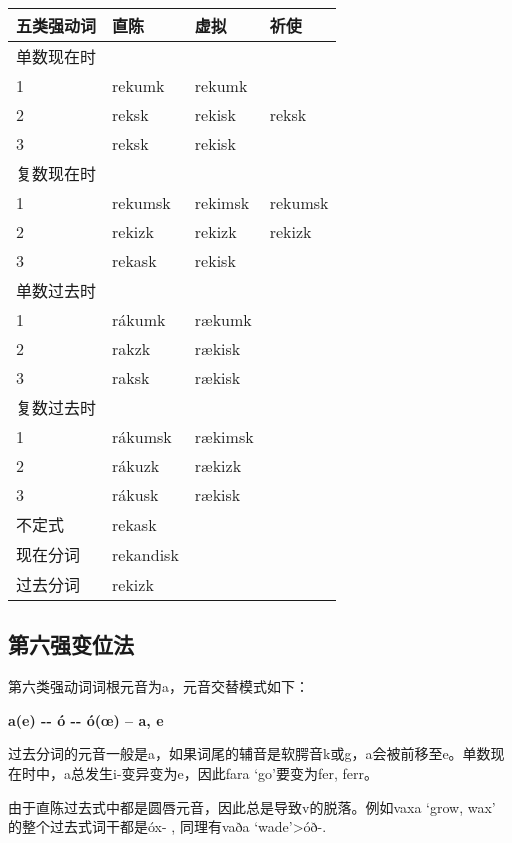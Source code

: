\begin{longtable}{llll}
  \toprule
  五类强动词 & 直陈        & 虚拟      & 祈使      \\
  \midrule
  \endhead
  \bottomrule
  \endfoot
  单数现在时 &           &         &         \\
  1     & rekumk    & rekumk  &         \\
  2     & reksk     & rekisk  & reksk   \\
  3     & reksk     & rekisk  &         \\
  复数现在时 &           &         &         \\
  1     & rekumsk   & rekimsk & rekumsk \\
  2     & rekizk    & rekizk  & rekizk  \\
  3     & rekask    & rekisk  &         \\
  单数过去时 &           &         &         \\
  1     & rákumk    & rækumk  &         \\
  2     & rakzk     & rækisk  &         \\
  3     & raksk     & rækisk  &         \\
  复数过去时 &           &         &         \\
  1     & rákumsk   & rækimsk &         \\
  2     & rákuzk    & rækizk  &         \\
  3     & rákusk    & rækisk  &         \\
  不定式   & rekask    &         &         \\
  现在分词  & rekandisk &         &         \\
  过去分词  & rekizk    &         &         \\
\end{longtable}

\subsection{第六强变位法}\label{第六强变位法}

第六类强动词词根元音为a，元音交替模式如下：

\textbf{a(e) -\/- ó -\/- ó(œ) -- a, e}

过去分词的元音一般是a，如果词尾的辅音是软腭音k或g，a会被前移至e。单数现在时中，a总发生i-变异变为e，因此fara
`go‌'要变为fer, ferr。

由于直陈过去式中都是圆唇元音，因此总是导致v的脱落。例如vaxa `grow, wax‌'
的整个过去式词干都是óx- , 同理有vaða `wade‌'\textgreater óð-.

